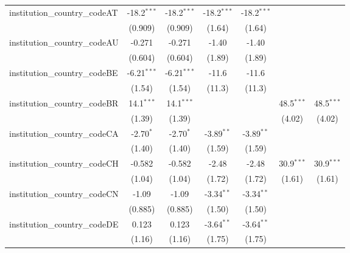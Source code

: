\begin{tabular}{lcccccc}
   institution\_country\_codeAT          & -18.2$^{***}$ & -18.2$^{***}$ & -18.2$^{***}$ & -18.2$^{***}$ &               &   \\   
                                         & (0.909)       & (0.909)       & (1.64)        & (1.64)        &               &   \\   
   institution\_country\_codeAU          & -0.271        & -0.271        & -1.40         & -1.40         &               &   \\   
                                         & (0.604)       & (0.604)       & (1.89)        & (1.89)        &               &   \\   
   institution\_country\_codeBE          & -6.21$^{***}$ & -6.21$^{***}$ & -11.6         & -11.6         &               &   \\   
                                         & (1.54)        & (1.54)        & (11.3)        & (11.3)        &               &   \\   
   institution\_country\_codeBR          & 14.1$^{***}$  & 14.1$^{***}$  &               &               & 48.5$^{***}$  & 48.5$^{***}$\\   
                                         & (1.39)        & (1.39)        &               &               & (4.02)        & (4.02)\\   
   institution\_country\_codeCA          & -2.70$^{*}$   & -2.70$^{*}$   & -3.89$^{**}$  & -3.89$^{**}$  &               &   \\   
                                         & (1.40)        & (1.40)        & (1.59)        & (1.59)        &               &   \\   
   institution\_country\_codeCH          & -0.582        & -0.582        & -2.48         & -2.48         & 30.9$^{***}$  & 30.9$^{***}$\\   
                                         & (1.04)        & (1.04)        & (1.72)        & (1.72)        & (1.61)        & (1.61)\\   
   institution\_country\_codeCN          & -1.09         & -1.09         & -3.34$^{**}$  & -3.34$^{**}$  &               &   \\   
                                         & (0.885)       & (0.885)       & (1.50)        & (1.50)        &               &   \\   
   institution\_country\_codeDE          & 0.123         & 0.123         & -3.64$^{**}$  & -3.64$^{**}$  &               &   \\   
                                         & (1.16)        & (1.16)        & (1.75)        & (1.75)        &               &   \\   

\end{tabular}
